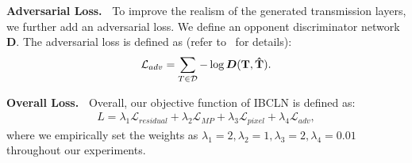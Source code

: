 \documentclass[10pt,twocolumn,letterpaper]{article}
\begin{document}
\noindent\textbf{Adversarial Loss.~}  
To improve the realism of the generated transmission layers, we further add an adversarial loss. We define an opponent discriminator network $\bm{D}$. The adversarial loss is defined as (refer to~\cite{zhang2018single} for details):
\begin{equation}
\vspace{-0.2em}
\mathcal{L}_{adv} =\sum_{T\in \mathcal{D}}{-\log \bm{D}( \mathbf{T},\mathbf{\hat{T}}) }. 
\vspace{-0.2em}
\end{equation}  
    
\noindent\textbf{Overall Loss.~}     
Overall, our objective function of IBCLN is defined as:
\begin{align}
L = \lambda_1 \mathcal{L}_{residual} + \lambda_2 \mathcal{L}_{MP}+ \lambda_3 \mathcal{L}_{pixel} + \lambda_4 \mathcal{L}_{adv},
\label{eq:pixelLoss}
\end{align} 
where we empirically set the weights as $\lambda_1 = 2, \lambda_2 = 1, \lambda_3 = 2, \lambda_4 = 0.01$  throughout our experiments.
\end{document}

